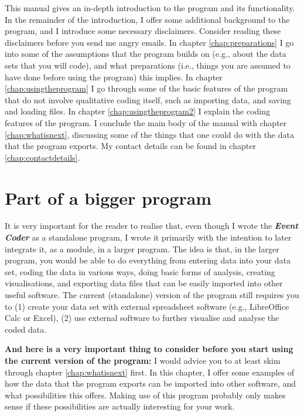 \documentclass{memoir}
\begin{document}
This manual gives an in-depth introduction to the program and its functionality. In the remainder of the introduction, I offer some additional background to the program, and I introduce some necessary disclaimers. Consider reading these disclaimers before you send me angry emails. In chapter \ref{chap:preparations} I go into some of the assumptions that the program builds on (e.g., about the data sets that you will code), and what preparations (i.e., things you are assumed to have done before using the program) this implies. In chapter \ref{chap:usingtheprogram} I go through some of the basic features of the program that do not involve qualitative coding itself, such as importing data, and saving and loading files. In chapter \ref{chap:usingtheprogram2} I explain the coding features of the program. I conclude the main body of the manual with chapter \ref{chap:whatisnext}, discussing some of the things that one could do with the data that the program exports. My contact details can be found in chapter \ref{chap:contactdetails}. 

\section{Part of a bigger program}
\label{sec:partofbiggerprogram}

It is very important for the reader to realise that, even though I wrote the \textbf{\emph{Event Coder}} as a standalone program, I wrote it primarily with the intention to later integrate it, as a module, in a larger program. The idea is that, in the larger program, you would be able to do everything from entering data into your data set, coding the data in various ways, doing basic forms of analysis, creating visualisations, and exporting data files that can be easily imported into other useful software. The current (standalone) version of the program still requires you to (1) create your data set with external spreadsheet software (e.g., LibreOffice Calc or Excel), (2) use external software to further visualise and analyse the coded data.

\textbf{And here is a very important thing to consider before you start using the current version of the program:} I would advice you to at least skim through chapter \ref{chap:whatisnext} first. In this chapter, I offer some examples of how the data that the program exports can be imported into other software, and what possibilities this offers. Making use of this program probably only makes sense if these possibilities are actually interesting for your work.
\end{document}
